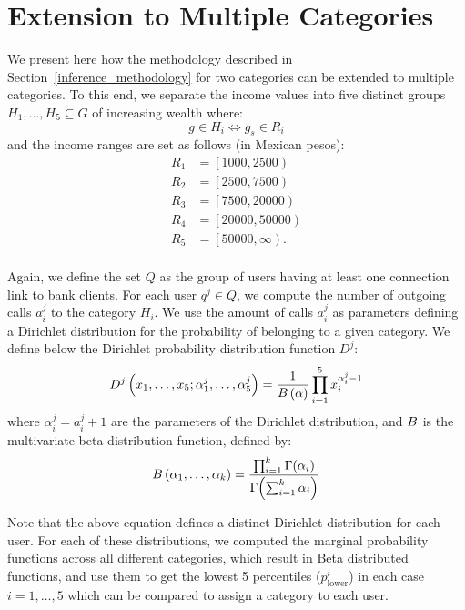 \section{Extension to Multiple Categories}

We present here how the methodology described in Section~\ref{inference_methodology} for
two categories can be extended to multiple categories.
To this end, we separate the income values into five distinct groups $ H_1, \ldots, H_5 \subseteq G$ of increasing wealth where:
\[
	g \in H_i \iff g_s \in R_i
\]
and the income ranges are set as follows (in Mexican pesos):
\begin{align*}
	R_1 &= \left[1000, 2500\right) \\
	R_2 &= \left[2500, 7500\right) \\
	R_3 &= \left[7500, 20000\right) \\
	R_4 &= \left[20000, 50000\right) \\
	R_5 &= \left[50000, \infty\right). \\
\end{align*}

Again, we define the set $Q$ as the group of users having at least one connection link to bank clients. For each user $q^j \in Q$, we compute the number of outgoing calls $a^j_i$ to the category $H_i$. 
We use the amount of calls $a^j_i$  as parameters defining a Dirichlet distribution for the probability of belonging to a given category. 
We define below the Dirichlet probability distribution function $D^j$:  
\begin{equation}
D^j \left( x_1, \ldots, x_5; \alpha^j_1, \ldots, \alpha^j_5 \right) = \frac{1}{B \left( \alpha \right)} \prod^5_{i = 1} x_i^{\alpha^j_i - 1}
\label{Dirichlet}
\end{equation}
where $\alpha^j_i = a^j_i +1$ are the parameters of the Dirichlet distribution, and $B$ is the multivariate beta distribution function, defined by: %
\begin{equation}
B \left( \alpha_1, \ldots, \alpha_k \right) = \frac{\prod^k_{i = 1} \Gamma \! \left( \alpha_i \right)}{\Gamma \! \left( \sum^k_{i = 1} \alpha_i \right) }
\label{Beta}
\end{equation}

Note that the above equation defines a distinct Dirichlet distribution for each user. For each of these distributions, we computed the marginal probability functions across all different categories, which result in Beta distributed functions, and use them to get the lowest 5 percentiles (\(p^i_{\operatorname{lower}}\)) in each case ${i=1, \ldots, 5}$ which can be compared to assign a category to each user.

